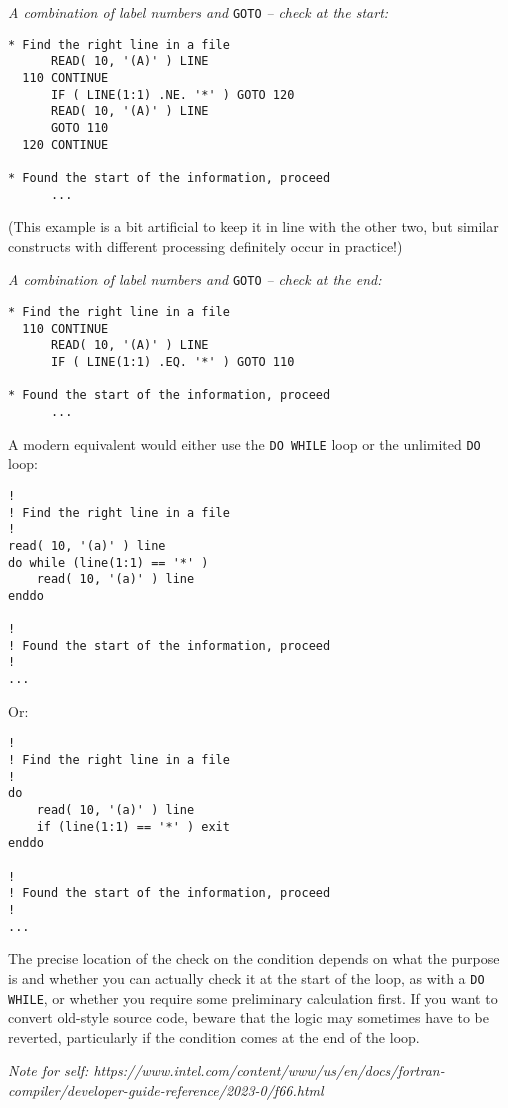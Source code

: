 \vspace{\baselineskip}
\noindent \emph{A combination of label numbers and} \verb+GOTO+ \emph{-- check at the start:}
\begin{verbatim}
* Find the right line in a file
      READ( 10, '(A)' ) LINE
  110 CONTINUE
      IF ( LINE(1:1) .NE. '*' ) GOTO 120
      READ( 10, '(A)' ) LINE
      GOTO 110
  120 CONTINUE

* Found the start of the information, proceed
      ...
\end{verbatim}
\noindent (This example is a bit artificial to keep it in line with the other two,
but similar constructs with different processing definitely occur in practice!)

\vspace{\baselineskip}
\noindent \emph{A combination of label numbers and} \verb+GOTO+ \emph{-- check at the end:}
\begin{verbatim}
* Find the right line in a file
  110 CONTINUE
      READ( 10, '(A)' ) LINE
      IF ( LINE(1:1) .EQ. '*' ) GOTO 110

* Found the start of the information, proceed
      ...
\end{verbatim}

A modern equivalent would either use the \verb+DO WHILE+ loop or the unlimited
\verb+DO+ loop:
%
\begin{verbatim}
!
! Find the right line in a file
!
read( 10, '(a)' ) line
do while (line(1:1) == '*' )
    read( 10, '(a)' ) line
enddo

!
! Found the start of the information, proceed
!
...
\end{verbatim}
%
Or:
%
\begin{verbatim}
!
! Find the right line in a file
!
do
    read( 10, '(a)' ) line
    if (line(1:1) == '*' ) exit
enddo

!
! Found the start of the information, proceed
!
...
\end{verbatim}

The precise location of the check on the condition depends on what the purpose is and
whether you can actually check it at the start of the loop, as with a \verb+DO WHILE+,
or whether you require some preliminary calculation first. If you want to convert
old-style source code, beware that the logic may sometimes have to be reverted,
particularly if the condition comes at the end of the loop.

\emph{Note for self: https://www.intel.com/content/www/us/en/docs/fortran-compiler/developer-guide-reference/2023-0/f66.html}

